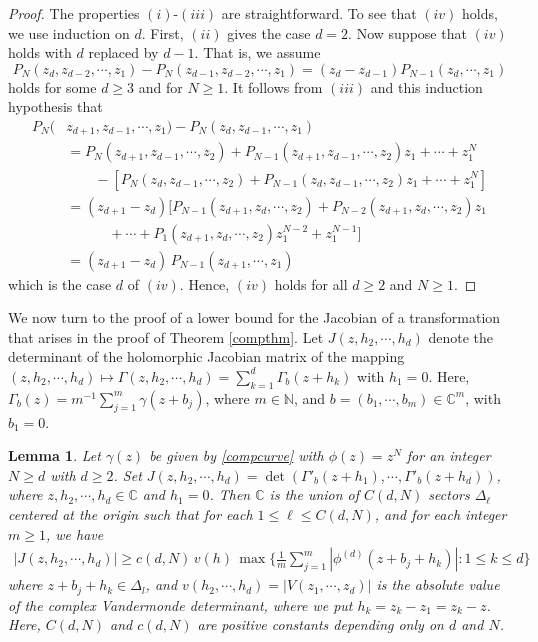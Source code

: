 \documentclass[11 pt]{amsart}
\theoremstyle{plain}
\newtheorem{lem}[theorem]{Lemma}
\numberwithin{equation}{section}
\theoremstyle{plain}
\numberwithin{equation}{section}
\theoremstyle{remark}
\begin{document}
\begin{proof}
The properties $(i)$-$(iii)$ are straightforward. To see that $(iv)$ holds, we use induction on $d$. First, $(ii)$ gives the case $d=2$.
Now suppose that $(iv)$ holds with $d$ replaced by $d-1$. That is, we assume
\[ P_N(z_d, z_{d-2}, \cdots, z_1) - P_N(z_{d-1}, z_{d-2},  \cdots, z_1) = (z_d - z_{d-1})P_{N-1}(z_d, \cdots , z_1)
\]
holds for some $d\ge 3$ and for $N\ge 1$. It follows from $(iii)$ and this induction hypothesis that
\begin{align*}
P_N ( &z_{d+1}, z_{d-1}, \cdots, z_1) - P_N(z_d, z_{d-1}, \cdots, z_1) \\
&= P_N(z_{d+1}, z_{d-1}, \cdots, z_2) + P_{N-1}( z_{d+1}, z_{d-1}, \cdots, z_2)z_1 + \cdots + z_1^N \\
&\qquad - [P_{N}(z_d, z_{d-1}, \cdots, z_2) + P_{N-1}( z_d, z_{d-1}, \cdots, z_2)z_1 + \cdots + z_1^N] \\
&= (z_{d+1} - z_d) \big[ P_{N-1}(z_{d+1}, z_{d}, \cdots, z_2) + P_{N-2}( z_{d+1}, z_{d}, \cdots, z_2)z_1  \\
 &\qquad \quad+ \cdots + P_1(z_{d+1}, z_{d}, \cdots, z_2)z_1^{N-2} + z_1^{N-1} \big] \\
&= (z_{d+1} - z_d)\, P_{N-1}(z_{d+1}, \cdots, z_1)
\end{align*}
which is the case $d$ of $(iv)$. Hence, $(iv)$ holds for all $d\ge 2$ and $N\ge 1$.
\end{proof}

We now turn to the proof of a lower bound for the Jacobian of a transformation that arises in the proof of Theorem \ref{compthm}.
Let $J(z, h_2, \cdots, h_d)$ denote the determinant of the holomorphic Jacobian matrix of the mapping $(z, h_2, \cdots , h_d) \mapsto \Gamma(z,h_2, \cdots,h_d) = \sum_{k=1}^d \Gamma_b(z+h_k)$ with $h_1=0$. Here, $\Gamma_b (z) = m^{-1 }\sum_{j=1}^m \gamma(z+
b_j)$, where $m\in {{\mathbb {N}}}$, and $b= (b_1, \cdots, b_m) \in {{\mathbb {C}}}^{m}$, with $b_1=0$.

\begin{lem}\label{jacest}
Let $\gamma(z)$ be given by \eqref{compcurve} with $\phi(z) = z^N$ for an integer $N \geq d$ with $d \ge 2$. Set $J(z, h_2, \cdots, h_d) = \det (\Gamma'_b(z+h_1), \cdots, \Gamma'_b(z+h_d))$, where $z, h_2, \cdots, h_d \in \mathbb{C}$ and $h_1 = 0$. Then $\mathbb{C}$ is the union of $C(d,N)$ sectors $\Delta_\ell$ centered at the origin such that for each $1 \leq \ell \leq C(d,N)$, and for each integer $m \geq 1$, we have
\begin{align}\label{J-max}  |J(z, h_2, \cdots, h_d)| \geq c(d,N) \, v(h)\, \max \Big\{ \frac{1}{m} \sum_{j=1}^m |\phi^{(d)}(z+b_j+h_k)| : 1 \leq k \leq d \Big\}
\end{align}
where $z+b_j+h_k \in \Delta_l$, and $v(h_2, \cdots, h_d) =|V(z_1, \cdots, z_d)|$ is the absolute value of the complex Vandermonde determinant, where we put $h_k = z_k-z_1 = z_k- z$. Here, $C(d,N)$ and $c(d,N)$ are positive constants depending only on $d$ and $N$.
\end{lem}
\end{document}
